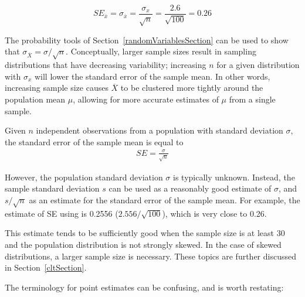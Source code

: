 \begin{spacing}{1.5}
\[SE_{\overline{x}} = \sigma_{\overline{x}} = \dfrac{\sigma_{x}}{\sqrt{n}} = \dfrac{2.6}{\sqrt{100}} = 0.26\]

The probability tools of Section~\ref{randomVariablesSection} can be used to show that $\sigma_{\overline{X}} = \sigma/\sqrt{n}$. Conceptually, larger sample sizes result in sampling distributions that have decreasing variability; increasing $n$ for a given distribution with $\sigma_{x}$ will lower the standard error of the sample mean. In other words, increasing sample size causes $\overline{X}$ to be clustered more tightly around the population mean $\mu$, allowing for more accurate estimates of $\mu$ from a single sample.




\begin{termBox}{
Given $n$ independent observations from a population with standard deviation $\sigma$, the standard error of the sample mean is equal to \vspace{-1mm}
\begin{align*}
SE = \frac{\sigma}{\sqrt{n}}
\label{seOfXBar}
\end{align*}\vspace{-3mm}%
}
\end{termBox}

However, the population standard deviation $\sigma$ is typically unknown. Instead, the sample standard deviation $s$ can be used as a reasonably good estimate of $\sigma$, and $s / \sqrt{n}$ as an estimate for the standard error of the sample mean. For example, the estimate of SE using  is 0.2556 ($2.556 / \sqrt{100}$), which is very close to 0.26.

This estimate tends to be sufficiently good when the sample size is at least 30 and the population distribution is not strongly skewed. In the case of skewed distributions, a larger sample size is necessary. These topics are further discussed in Section~\ref{cltSection}.

The terminology for point estimates can be confusing, and is worth restating:  


\end{spacing}
